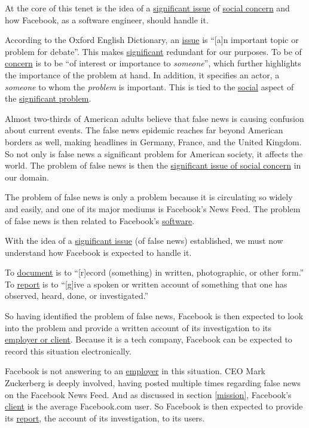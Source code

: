 \par At the core of this tenet is the idea of a \ul{significant issue} of \ul{social concern} and how Facebook, as a software engineer, should handle it.
\par According to the Oxford English Dictionary, an \ul{issue} is ``[a]n important topic or problem for debate''. \cite{oxford} This makes \ul{significant} redundant for our purposes. To be of \ul{concern} is to be ``of interest or importance to \emph{someone}'', \cite{oxford} which further highlights the importance of the problem at hand. In addition, it specifies an actor, a \emph{someone} to whom the \emph{problem} is important. This is tied to the \ul{social} aspect of the \ul{significant problem}.
\par Almost two-thirds of American adults believe that false news is causing confusion about current events. \cite{bbc_propaganda} The false news epidemic reaches far beyond American borders as well, making headlines in Germany, \cite{wp_germany} France, \cite{crosscheck} and the United Kingdom. \cite{guardian_steps} So not only is false news a significant problem for American society, it affects the world. The problem of false news is then the \ul{significant issue of social concern} in our domain.
\par The problem of false news is only a problem because it is circulating so widely and easily, and one of its major mediums is Facebook's News Feed. \cite{telegraph_fn} The problem of false news is then related to Facebook's \ul{software}.


\par With the idea of a \ul{significant issue} (of false news) established, we must now understand how Facebook is expected to handle it.
\par To \ul{document} is to ``[r]ecord (something) in written, photographic, or other form.'' \cite{oxford} To \ul{report} is to ``[g]ive a spoken or written account of something that one has observed, heard, done, or investigated.'' \cite{oxford}
\par So having identified the problem of false news, Facebook is then expected to look into the problem and provide a written account of its investigation to its \ul{employer or client}. Because it is a tech company, Facebook can be expected to record this situation electronically.
\par Facebook is not answering to an \ul{employer} in this situation. CEO Mark Zuckerberg is deeply involved, having posted multiple times regarding false news on the Facebook News Feed. \cite{tc_responsibility} And as discussed in section \ref{mission}, Facebook's \ul{client} is the average Facebook.com user. So Facebook is then expected to provide its \ul{report}, the account of its investigation, to its users.

